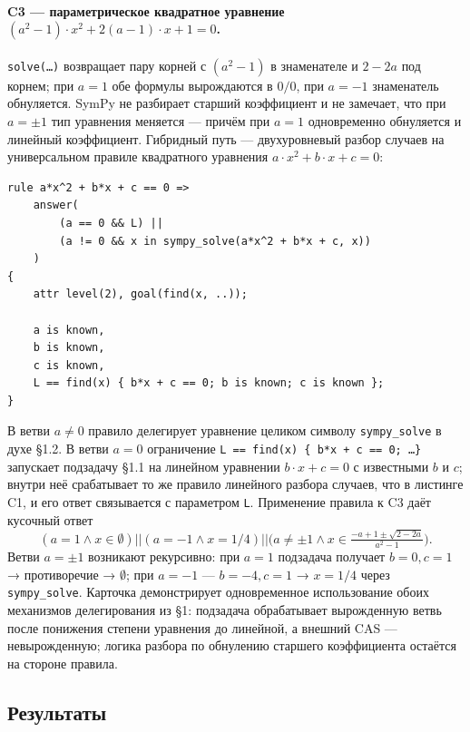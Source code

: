 \documentclass{intsys}
\begin{document}
\paragraph{C3 --- параметрическое квадратное уравнение
$(a^2 - 1) \cdot x^2 + 2(a - 1) \cdot x + 1 = 0$.} \texttt{solve(\ldots)}
возвращает пару корней с $(a^2 - 1)$ в знаменателе и $2 - 2a$ под
корнем; при $a = 1$ обе формулы вырождаются в $0/0$, при $a = -1$
знаменатель обнуляется. SymPy не разбирает старший коэффициент и не
замечает, что при $a = \pm 1$ тип уравнения меняется --- причём при
$a = 1$ одновременно обнуляется и линейный коэффициент. Гибридный
путь --- двухуровневый разбор случаев на универсальном правиле
квадратного уравнения $a \cdot x^2 + b \cdot x + c = 0$:

\begin{lstlisting}
rule a*x^2 + b*x + c == 0 =>
    answer(
        (a == 0 && L) ||
        (a != 0 && x in sympy_solve(a*x^2 + b*x + c, x))
    )
{
    attr level(2), goal(find(x, ..));

    a is known,
    b is known,
    c is known,
    L == find(x) { b*x + c == 0; b is known; c is known };
}
\end{lstlisting}

В ветви $a \neq 0$ правило делегирует уравнение целиком символу
\texttt{sympy\_solve} в духе \S1.2. В ветви $a = 0$ ограничение
\texttt{L == find(x) \{ b*x + c == 0; \ldots \}} запускает
подзадачу \S1.1 на линейном уравнении $b \cdot x + c = 0$ с
известными $b$ и $c$; внутри неё срабатывает то же правило
линейного разбора случаев, что в листинге C1, и его ответ
связывается с параметром \texttt{L}. Применение правила к C3 даёт
кусочный ответ
\[
  (a = 1 \wedge x \in \emptyset)
  \mathrel{||}
  (a = -1 \wedge x = 1/4)
  \mathrel{||}
  \bigl(a \neq \pm 1 \wedge x \in
  \tfrac{- a + 1 \pm \sqrt{2 - 2a}}{a^2 - 1}\bigr).
\]
Ветви $a = \pm 1$ возникают рекурсивно: при $a = 1$ подзадача
получает $b = 0, c = 1$ → противоречие → $\emptyset$; при $a = -1$ ---
$b = -4, c = 1$ → $x = 1/4$ через \texttt{sympy\_solve}. Карточка
демонстрирует одновременное использование обоих механизмов
делегирования из \S1: подзадача обрабатывает вырожденную ветвь
после понижения степени уравнения до линейной, а внешний CAS ---
невырожденную; логика разбора по обнулению старшего коэффициента
остаётся на стороне правила.

\subsection{Результаты}
\end{document}
